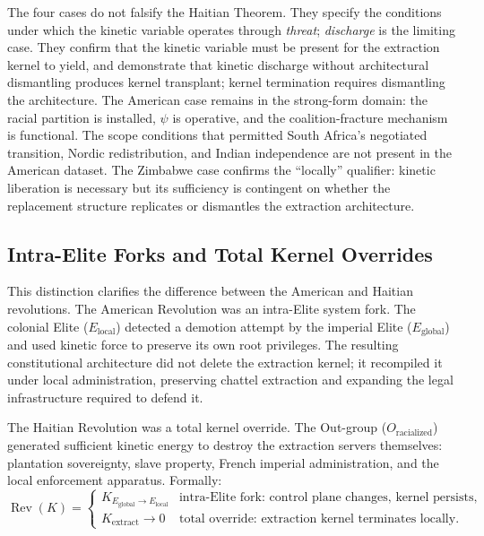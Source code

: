 The four cases do not falsify the Haitian Theorem. They specify the conditions under which the kinetic variable operates through \textit{threat}; \textit{discharge} is the limiting case. They confirm that the kinetic variable must be present for the extraction kernel to yield, and demonstrate that kinetic discharge without architectural dismantling produces kernel transplant; kernel termination requires dismantling the architecture. The American case remains in the strong-form domain: the racial partition is installed, $\psi$ is operative, and the coalition-fracture mechanism is functional. The scope conditions that permitted South Africa's negotiated transition, Nordic redistribution, and Indian independence are not present in the American dataset. The Zimbabwe case confirms the ``locally'' qualifier: kinetic liberation is necessary but its sufficiency is contingent on whether the replacement structure replicates or dismantles the extraction architecture.

\subsection{Intra-Elite Forks and Total Kernel Overrides}

This distinction clarifies the difference between the American and Haitian revolutions. The American Revolution was an intra-Elite system fork. The colonial Elite ($E_{\text{local}}$) detected a demotion attempt by the imperial Elite ($E_{\text{global}}$) and used kinetic force to preserve its own root privileges. The resulting constitutional architecture did not delete the extraction kernel; it recompiled it under local administration, preserving chattel extraction and expanding the legal infrastructure required to defend it.

The Haitian Revolution was a total kernel override. The Out-group ($O_{\text{racialized}}$) generated sufficient kinetic energy to destroy the extraction servers themselves: plantation sovereignty, slave property, French imperial administration, and the local enforcement apparatus. Formally:
\begin{equation}\label{eq:12.6a-revolution-types}
\operatorname{Rev}(K)=
\begin{cases}
K_{E_{\text{global}} \to E_{\text{local}}} & \text{intra-Elite fork: control plane changes, kernel persists},\\
K_{\text{extract}} \to 0 & \text{total override: extraction kernel terminates locally}.
\end{cases}
\end{equation}

